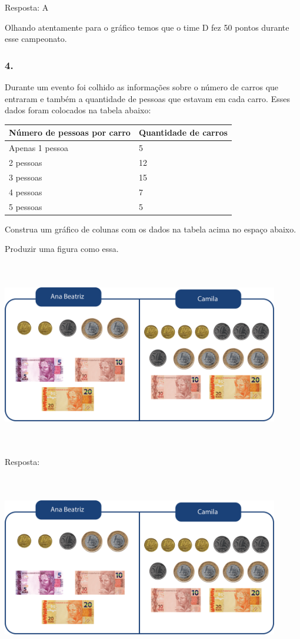 Resposta: A

Olhando atentamente para o gráfico temos que o time D fez 50 pontos
durante esse campeonato.

\subsubsection{4.}\label{section-111}

Durante um evento foi colhido as informações sobre o número de carros
que entraram e também a quantidade de pessoas que estavam em cada carro.
Esses dados foram colocados na tabela abaixo:

\begin{longtable}[]{@{}ll@{}}
\toprule
Número de pessoas por carro & Quantidade de carros\tabularnewline
\midrule
\endhead
Apenas 1 pessoa & 5\tabularnewline
2 pessoas & 12\tabularnewline
3 pessoas & 15\tabularnewline
4 pessoas & 7\tabularnewline
5 pessoas & 5\tabularnewline
\bottomrule
\end{longtable}

Construa um gráfico de colunas com os dados na tabela acima no espaço
abaixo.

Produzir uma figura como essa.

\includegraphics[width=4.76708in,height=3.21695in]{media/image95.png}

Resposta:

\includegraphics[width=4.76708in,height=3.21695in]{media/image95.png}

